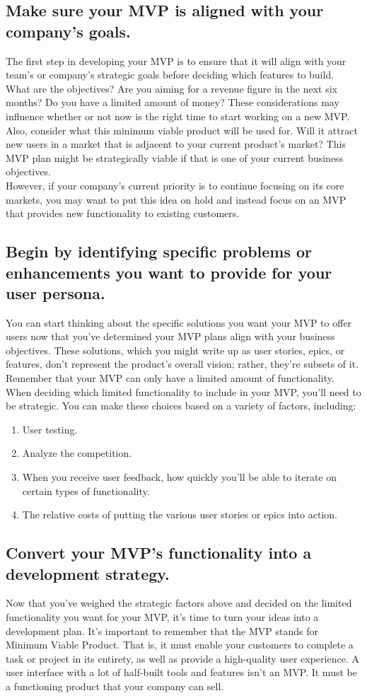 \documentclass[paper=a4, fontsize=11pt]{scrartcl}
\numberwithin{equation}{section}		%
\numberwithin{figure}{section}			%
\numberwithin{table}{section}				%
\begin{document}
\subsection{Make sure your MVP is aligned with your company's goals.}
The first step in developing your MVP is to ensure that it will align with your team's or company's strategic goals before deciding which features to build.\\
What are the objectives? Are you aiming for a revenue figure in the next six months? Do you have a limited amount of money? These considerations may influence whether or not now is the right time to start working on a new MVP.
Also, consider what this minimum viable product will be used for. Will it attract new users in a market that is adjacent to your current product's market? This MVP plan might be strategically viable if that is one of your current business objectives.\\
However, if your company's current priority is to continue focusing on its core markets, you may want to put this idea on hold and instead focus on an MVP that provides new functionality to existing customers.
\newpage
\subsection{Begin by identifying specific problems or enhancements you want to provide for your user persona.}
You can start thinking about the specific solutions you want your MVP to offer users now that you've determined your MVP plans align with your business objectives. These solutions, which you might write up as user stories, epics, or features, don't represent the product's overall vision; rather, they're subsets of it. Remember that your MVP can only have a limited amount of functionality.
When deciding which limited functionality to include in your MVP, you'll need to be strategic. You can make these choices based on a variety of factors, including:
\begin{enumerate}
    \item User testing.
    \item Analyze the competition.
    \item When you receive user feedback, how quickly you'll be able to iterate on certain types of functionality.
    \item The relative costs of putting the various user stories or epics into action.
\end{enumerate}
\newpage

\subsection{Convert your MVP's functionality into a development strategy.}
Now that you've weighed the strategic factors above and decided on the limited functionality you want for your MVP, it's time to turn your ideas into a development plan.
It's important to remember that the MVP stands for Minimum Viable Product. That is, it must enable your customers to complete a task or project in its entirety, as well as provide a high-quality user experience. A user interface with a lot of half-built tools and features isn't an MVP. It must be a functioning product that your company can sell.
\newpage
\end{document}

